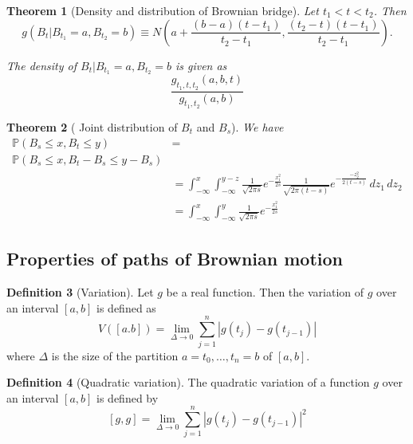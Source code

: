 \documentclass[10pt, oneside, reqno]{amsart}
\theoremstyle{plain}%
\newtheorem{thm}{Theorem}[section]
\theoremstyle{definition}
\newtheorem{defn}[thm]{Definition}
\theoremstyle{remark}
\renewcommand{\P}{\mathbb{P}}
\begin{document}
\begin{thm}[Density and distribution of Brownian bridge]
	Let $t_1  < t < t_2$.  Then \[
		g( B_t | B_{t_1} = a, B_{t_2} = b ) \equiv N\left(a + \frac{(b-a)(t-t_1)}{t_2 - t_1}, \frac{(t_2-t)(t-t_1)}{t_2 - t_1} \right).
	\]
	
	The density of $B_t | B_{t_1} =a , B_{t_2} = b$ is given as \[
		\frac{g_{t_1, t, t_2}(a,b,t)}{g_{t_1, t_2}(a,b)}
	\]
\end{thm}

\begin{thm}[ Joint distribution of $B_t$ and $B_s$]
	We have 
	\begin{align*}
		\P(B_s \leq x, B_t \leq y) &= \\ \P(B_s \leq x, B_{t} - B_s \leq y - B_s ) \\
		&= \int_{-\infty}^x \int_{-\infty}^{y-z} \frac{1}{\sqrt{2\pi s}} e^{-\frac{x_1^2}{2s}} \frac{1}{\sqrt{2 \pi (t-s)}} e^{-\frac{-z_2^2}{2(t-s)}} \, dz_1 \, dz_2 \\
		&= \int_{-\infty}^x \int_{-\infty}^y \frac{1}{\sqrt{2\pi s}} e^{-\frac{x_1^2}{2s}} 
	\end{align*}
\end{thm}

\subsection{Properties of paths of Brownian motion} %
\label{sub:properties_of_paths_of_brownian_motion}

\begin{defn}[Variation]
	Let $g$ be a real function.  Then the variation of $g$ over an interval $[a,b]$ is defined as \[
		V([a.b]) = \lim_{\Delta \rightarrow 0} \sum_{j = 1}^n | g(t_j) - g(t_{j-1}) |
	\] where $\Delta$ is the size of the partition $a = t_0, \dots, t_n = b$ of $[a,b]$.
\end{defn}

\begin{defn}[Quadratic variation]
	The quadratic variation of a function $g$ over an interval $[a,b]$ is defined by \[
		[g,g] = \lim_{\Delta \rightarrow 0} \sum_{j = 1}^n | g(t_j) - g(t_{j-1})|^2	\]
\end{defn}
\end{document}
